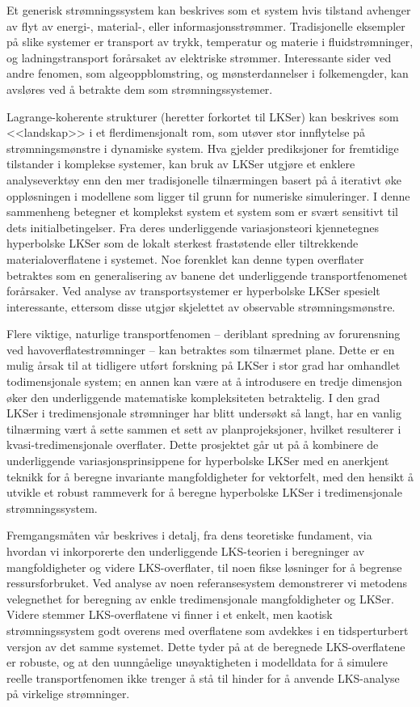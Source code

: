 \begingroup
\vspace{3mm}
Et generisk strømningssystem kan beskrives som et system hvis tilstand avhenger
av flyt av energi-, material-, eller informasjonsstrømmer. Tradisjonelle
eksempler på slike systemer er transport av trykk, temperatur og materie i
fluidstrømninger, og ladningstransport forårsaket av elektriske strømmer.
Interessante sider ved andre fenomen, som algeoppblomstring, og
mønsterdannelser i folkemengder, kan avsløres ved å betrakte dem som
strømningssystemer.

Lagrange-koherente strukturer (heretter forkortet til LKSer) kan beskrives som
<<landskap>> i et flerdimensjonalt rom, som utøver stor innflytelse på
strømningsmønstre i dynamiske system. Hva gjelder prediksjoner for fremtidige
tilstander i komplekse systemer, kan bruk av LKSer utgjøre et enklere
analyseverktøy enn den mer tradisjonelle tilnærmingen basert på å
iterativt øke oppløsningen i modellene som ligger til grunn for numeriske
simuleringer. I denne sammenheng betegner et komplekst system et system som er
svært sensitivt til dets initialbetingelser. Fra deres underliggende
variasjonsteori kjennetegnes hyperbolske LKSer som de lokalt sterkest
frastøtende eller tiltrekkende materialoverflatene i systemet. Noe forenklet
kan denne typen overflater betraktes som en generalisering av banene det
underliggende transportfenomenet forårsaker. Ved analyse av transportsystemer
er hyperbolske LKSer spesielt interessante, ettersom disse utgjør skjelettet av
observable strømningsmønstre.

Flere viktige, naturlige transportfenomen -- deriblant spredning av
forurensning ved havoverflatestrømninger -- kan betraktes som tilnærmet plane.
Dette er en mulig årsak til at tidligere utført forskning på LKSer i stor grad
har omhandlet todimensjonale system; en annen kan være at å introdusere en
tredje dimensjon øker den underliggende matematiske kompleksiteten betraktelig.
I den grad LKSer i tredimensjonale strømninger har blitt undersøkt så langt,
har en vanlig tilnærming vært å sette sammen et sett av planprojeksjoner,
hvilket resulterer i kvasi-tredimensjonale overflater. Dette prosjektet går ut
på å kombinere de underliggende variasjonsprinsippene for hyperbolske LKSer med
en anerkjent teknikk for å beregne invariante mangfoldigheter for vektorfelt,
med den hensikt å utvikle et robust rammeverk for å beregne hyperbolske LKSer i
tredimensjonale strømningssystem.

Fremgangsmåten vår beskrives i detalj, fra dens teoretiske fundament, via
hvordan vi inkorporerte den underliggende LKS-teorien i beregninger av
mangfoldigheter og videre LKS-overflater, til noen fikse løsninger for å
begrense ressursforbruket. Ved analyse av noen referansesystem demonstrerer vi
metodens velegnethet for beregning av enkle tredimensjonale mangfoldigheter og
LKSer. Videre stemmer LKS-overflatene vi finner i et enkelt, men kaotisk
strømningssystem godt overens med overflatene som avdekkes i en tidsperturbert
versjon av det samme systemet. Dette tyder på at de beregnede LKS-overflatene
er robuste, og at den uunngåelige unøyaktigheten i modelldata for å simulere
reelle transportfenomen ikke trenger å stå til hinder for å anvende LKS-analyse
på virkelige strømninger.

